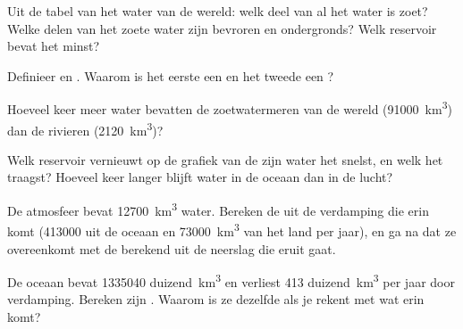 \begin{exercise}[$\star$]\label{exo:g10:freshwater-resources:2}
Uit de tabel van het water van de wereld: welk deel van al het water is zoet?
Welke delen van het zoete water zijn bevroren en ondergronds? Welk reservoir
bevat het minst?
\end{exercise}

\begin{exercise}[$\star$]\label{exo:g10:freshwater-resources:3}
Definieer  en . Waarom is het eerste een
 en het tweede een ?
\end{exercise}

\begin{exercise}[$\star$]\label{exo:g10:freshwater-resources:4}
Hoeveel keer meer water bevatten de zoetwatermeren van de wereld
(\num{91000}~\unit{km^3}) dan de rivieren (\num{2120}~\unit{km^3})?
\end{exercise}

\begin{exercise}[$\star$]\label{exo:g10:freshwater-resources:5}
Welk reservoir vernieuwt op de grafiek van de  zijn water het
snelst, en welk het traagst? Hoeveel keer langer blijft water in de oceaan dan
in de lucht?
\end{exercise}

\begin{exercise}[$\star\star$]\label{exo:g10:freshwater-resources:6}
De atmosfeer bevat \num{12700}~\unit{km^3} water. Bereken de  uit de
verdamping die erin komt (\num{413000} uit de oceaan en
\num{73000}~\unit{km^3} van het land per jaar), en ga na dat ze overeenkomt met
de  berekend uit de neerslag die eruit gaat.
\end{exercise}

\begin{exercise}[$\star\star$]\label{exo:g10:freshwater-resources:7}
De oceaan bevat \num{1335040} duizend~\unit{km^3} en verliest
\num{413} duizend~\unit{km^3} per jaar door verdamping. Bereken zijn
. Waarom is ze dezelfde als je rekent met wat erin komt?
\end{exercise}

